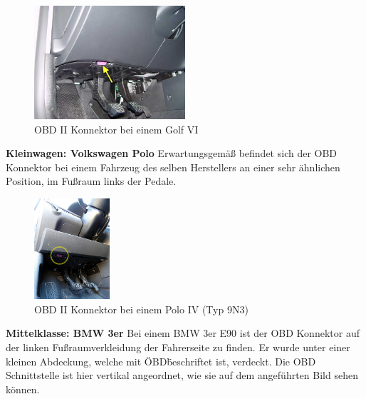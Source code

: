 \begin{figure}[!htb]\centering
	\includegraphics[width=0.5\textwidth]{images/golfobd}
	\caption{OBD II Konnektor bei einem Golf VI \cite{SIMR.CH2-CAN-Bus.GolfOBD}}\label{Fig:Data3}
\end{figure}

\textbf{Kleinwagen: Volkswagen Polo}
Erwartungsgemäß befindet sich der OBD Konnektor bei einem Fahrzeug des selben Herstellers an einer sehr ähnlichen Position, im Fußraum links der Pedale.

\begin{figure}[!htb]\centering
	\includegraphics[width=0.25\textwidth]{images/poloobd}
	\caption{OBD II Konnektor bei einem Polo IV (Typ 9N3) \cite{SIMR.CH2-CAN-Bus.PoloOBD}}\label{Fig:Data3}
\end{figure}

\textbf{Mittelklasse: BMW 3er}
Bei einem BMW 3er E90 ist der OBD Konnektor auf der linken Fußraumverkleidung der Fahrerseite zu finden. Er wurde unter einer kleinen Abdeckung, welche mit \"OBD\" beschriftet ist, verdeckt. Die OBD Schnittstelle ist hier vertikal angeordnet, wie sie auf dem angeführten Bild sehen können.

